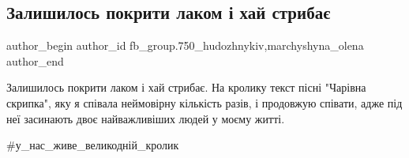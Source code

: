  
 
 
 
 

\subsection{Залишилось покрити лаком і хай стрибає}
\label{sec:29_03_2018.fb.fb_group.750_hudozhnykiv.2.zalyshylos_pokryty_lakom_i_haj_strybaje}
 
\ifcmt
 author_begin
   author_id fb_group.750_hudozhnykiv,marchyshyna_olena
 author_end
\fi

Залишилось покрити лаком і хай стрибає. На кролику текст пісні "Чарівна
скрипка", яку я співала неймовірну кількість разів, і продовжую співати, адже
під неї засинають двоє найважливіших людей у моєму житті.

\#у\_нас\_живе\_великодній\_кролик

